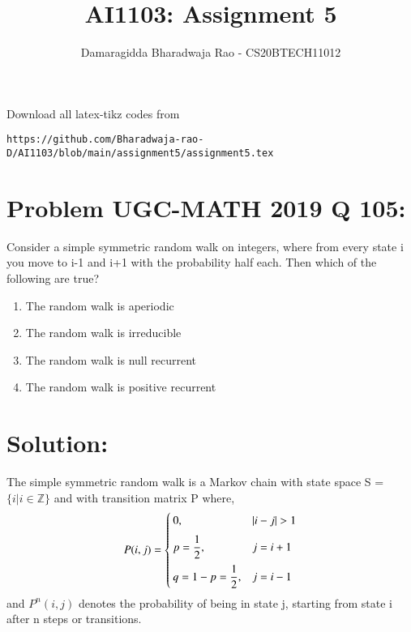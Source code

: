 \documentclass[journal,12pt,twocolumn]{IEEEtran}
\begin{document}
     \def\rightbox#1{\makebox[0in][r]{#1}}
     \def\centbox#1{\makebox[0in]{#1}}
     \def\topbox#1{\raisebox{-\baselineskip}[0in][0in]{#1}}
     \def\midbox#1{\raisebox{-0.5\baselineskip}[0in][0in]{#1}}
\vspace{3cm}
\title{AI1103: Assignment 5}
\author{Damaragidda Bharadwaja Rao - CS20BTECH11012}
\maketitle
\newpage
\bigskip
\renewcommand{\thefigure}{\theenumi}
\renewcommand{\thetable}{\theenumi}
Download all latex-tikz codes from 
\begin{lstlisting}
https://github.com/Bharadwaja-rao-D/AI1103/blob/main/assignment5/assignment5.tex
\end{lstlisting}
\section*{Problem UGC-MATH 2019 Q 105:}
Consider a simple symmetric random walk on integers, where from every state i you move to i-1 and i+1 with the probability half each. Then which of the following are true?
\begin{enumerate}
\item The random walk is aperiodic
\item The random walk is irreducible
\item The random walk is null recurrent 
\item The random walk is positive recurrent
\end{enumerate}
\section*{Solution:}
The simple symmetric random walk is a Markov chain with state space S = $\{i | i \in \mathbb{Z}\}$ and with transition matrix P where, 
\begin{equation}
  P(i,j)=\begin{cases}
  0 , &|i-j|>1\vspace{0.2cm}\\
  p = \dfrac{1}{2} , &j = i+1\vspace{0.2cm}\\
  q =1-p = \dfrac{1}{2} , &j = i-1\\
  \end{cases}
\end{equation}
and $P^n(i,j)$ denotes the probability of being in state j, starting from state i after n steps or transitions. 
\end{document}

